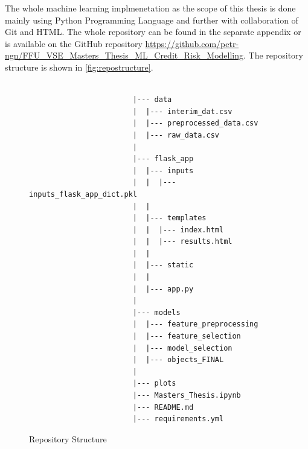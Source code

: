     The whole machine learning implmenetation as the scope of this thesis is done mainly using Python Programming Language and further with collaboration of Git and HTML.
    The whole repository can be found in the separate appendix or is available on the GitHub repository \url{https://github.com/petr-ngn/FFU_VSE_Masters_Thesis_ML_Credit_Risk_Modelling}.
    The repository structure is shown in \autoref{fig:repostructure}.
    \begin{figure}[H]
        \centering\caption{Repository Structure}
        \label{fig:repostructure}

    {\footnotesize
    \begin{verbatim}

                        |--- data
                        |  |--- interim_dat.csv
                        |  |--- preprocessed_data.csv
                        |  |--- raw_data.csv
                        |
                        |--- flask_app
                        |  |--- inputs
                        |  |  |--- inputs_flask_app_dict.pkl
                        |  |
                        |  |--- templates
                        |  |  |--- index.html
                        |  |  |--- results.html
                        |  |
                        |  |--- static
                        |  |
                        |  |--- app.py
                        |
                        |--- models
                        |  |--- feature_preprocessing
                        |  |--- feature_selection
                        |  |--- model_selection
                        |  |--- objects_FINAL
                        |
                        |--- plots
                        |--- Masters_Thesis.ipynb
                        |--- README.md
                        |--- requirements.yml
    \end{verbatim}
    }
    \vspace{0em}
    \end{figure}


